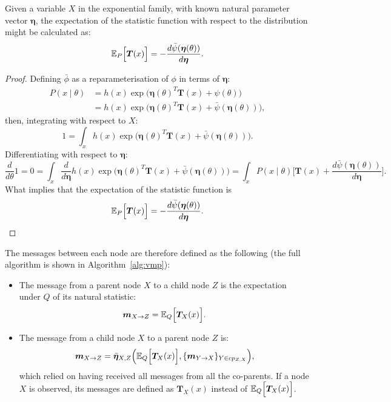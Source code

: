 \begin{proposition}\label{prop:vmp}
  Given a variable \(X\) in the exponential family, with known natural parameter vector \(\bm{\eta}\),  the expectation of the statistic function with respect to the distribution might be calculated as:
    \[
    \mathbb{E}_{P}\Big[\bm{T}(x)\Big] =   -  \frac{ d\bar{\psi}(\bm{\eta}(\theta)) }{d \bm{\eta}}.
  \]
\end{proposition}
\begin{proof}
  Defining \(\bar{\phi}\) as a reparameterisation of \(\phi\) in terms of \(\bm{\eta}\):
  \[
    \begin{aligned}
      P(x\mid \theta) &= h(x)\exp \Big( \bm{\eta}{(\theta)}^{T}\bm{T}(x) + \psi(\theta) \Big)\\
       &= h(x)\exp \Big( \bm{\eta}{(\theta)}^{T}\bm{T}(x) + \bar{\psi}(\bm{\eta}(\theta)) \Big),
    \end{aligned}
  \]
  then, integrating with respect to \(X\):
  \[
    1 = \int_{x} h(x)\exp \Big( \bm{\eta}{(\theta)}^{T}\bm{T}(x) + \bar{\psi}(\bm{\eta}(\theta)) \Big).
  \]
  Differentiating with respect to \(\bm{\eta}\):
  \[
    \frac{d}{d\theta}1 = 0 = \int_{x} \frac{d}{d\bm{\eta}}h(x)\exp \Big( \bm{\eta}{(\theta)}^{T}\bm{T}(x) + \bar{\psi}(\bm{\eta}(\theta)) \Big) = \int_{x}P(x \mid \theta)\Big[ \bm{T}(x) + \frac{ d\bar{\psi}(\bm{\eta}(\theta)) }{d \bm{\eta}}\Big].
  \]
  What implies that the expectation of the statistic function is
  \[
    \mathbb{E}_{P}\Big[\bm{T}(x)\Big] =   -  \frac{ d\bar{\psi}(\bm{\eta}(\theta)) }{d \bm{\eta}}.
  \]
\end{proof}

The messages between each node are therefore defined as the following (the full algorithm is shown in Algorithm~\ref{alg:vmp}):
\begin{itemize}
  \item The message from a parent node \( X \) to a child node \( Z \) is the expectation under \( Q \) of its natural statistic:
    \[
    \bm{m}_{X \to Z} = \mathbb{E}_{Q}\Big[\bm{T}_{X}(x)\Big].
    \]
  \item The message from a child node \( X \) to a parent node \( Z \) is:
    \[
    \bm{m}_{X \to Z} = \bar{\bm{\eta}}_{X,Z}\Big(\mathbb{E}_{Q}\Big[\bm{T}_X(x)\Big], \{\bm{m}_{Y \to X}\}_{Y \in cp_{Z,X}}\Big),
    \]
    which relied on having received all messages from all the co-parents. If a node \( X \)  is observed, its messages are defined as \( \bm{T}_X(x) \) instead of \( \mathbb{E}_{Q}\Big[\bm{T}_X(x)\Big] \).
\end{itemize}

